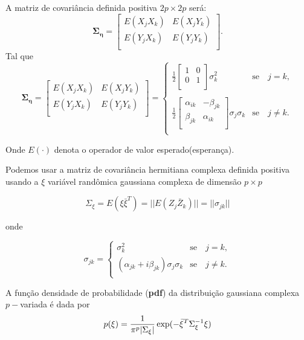 \documentclass[12pt,a4paper]{article}
\begin{document}
A matriz de covariância definida positiva $2p\times 2p$ será:
$$
\mathbf{\Sigma_{\eta}} = \left[
\begin{array}{cc}
	E(X_jX_k)  & E(X_jY_k)  \\
	E(Y_jX_k)  & E(Y_jY_k)  \\
\end{array}
\right].
$$
Tal que
$$
\mathbf{\Sigma_{\eta}} = \left[
\begin{array}{cc}
	E(X_jX_k)  & E(X_jY_k)  \\
	E(Y_jX_k)  & E(Y_jY_k)  \\
\end{array}
\right]= \left\{
\begin{array}{cc}
	\frac{1}{2}\left[
\begin{array}{cc}
	 1 & 0  \\
	 0 & 1  \\
\end{array}
	\right]\sigma^{2}_{k}  & \mbox{se}\quad j=k, \\
	& \\
	\frac{1}{2}\left[
\begin{array}{cc}
	\alpha_{ik} & -\beta_{jk}  \\
	 \beta_{jk} & \alpha_{ik}  \\
\end{array}
	\right]\sigma_j\sigma_k  & \mbox{se}\quad j\neq k.   \\
\end{array}
\right.
$$

Onde $E(\cdot)$ denota o operador de valor esperado(esperança).

Podemos usar a matriz de covariância hermitiana complexa definida positiva usando a $\xi$ variável randômica gaussiana complexa de dimensão $p\times p$

$$\Sigma_{\xi}=E(\xi\bar{\xi}^{T})=||E(Z_j\bar{Z}_k)||=||\sigma_{jk}||$$

onde

$$
\sigma_{jk} = \left\{
\begin{array}{cc}
	\sigma_k^2                                & \mbox{se}\quad j=k,  \\
	(\alpha_{jk}+i\beta_{jk})\sigma_j\sigma_k & \mbox{se}\quad j\neq k. \\
\end{array}
\right.
$$

A função densidade de probabilidade ({\bf pdf}) da distribuição gaussiana complexa $p-$variada é dada por
\begin{equation}\label{eqn69}
	p(\xi)=\frac{1}{\pi^p|\Sigma_{\xi}|}\exp(-\bar{\xi}^{T}\Sigma_{\xi}^{-1}\xi)  \\
\end{equation}
\end{document}
